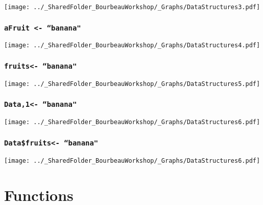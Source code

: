 \documentclass{beamer}
\begin{document}
    \begin{frame}
        \frametitle{} \vspace{0.7cm}
        \begin{center}
            \texttt{[image: ../\_SharedFolder\_BourbeauWorkshop/\_Graphs/DataStructures3.pdf]}
        \end{center}
    \end{frame}

    \begin{frame}
        \frametitle{\texttt{aFruit <- ``banana"}} \vspace{0.6cm}
        \begin{center}
            \texttt{[image: ../\_SharedFolder\_BourbeauWorkshop/\_Graphs/DataStructures4.pdf]}
        \end{center}
    \end{frame}

    \begin{frame}
        \frametitle{\texttt{fruits\rbrack <- ``banana"}} \vspace{0.6cm}
        \begin{center}
            \texttt{[image: ../\_SharedFolder\_BourbeauWorkshop/\_Graphs/DataStructures5.pdf]}
        \end{center}
    \end{frame}

    \begin{frame}
        \frametitle{\texttt{Data,1\rbrack  <- ``banana"}} \vspace{0.6cm}
        \begin{center}
            \texttt{[image: ../\_SharedFolder\_BourbeauWorkshop/\_Graphs/DataStructures6.pdf]}
        \end{center}
    \end{frame}
    
    \begin{frame}
        \frametitle{\texttt{Data\$fruits\rbrack <- ``banana"}} \vspace{0.6cm}
        \begin{center}
            \texttt{[image: ../\_SharedFolder\_BourbeauWorkshop/\_Graphs/DataStructures6.pdf]}
        \end{center}
    \end{frame}




\section{Functions}
\end{document}
